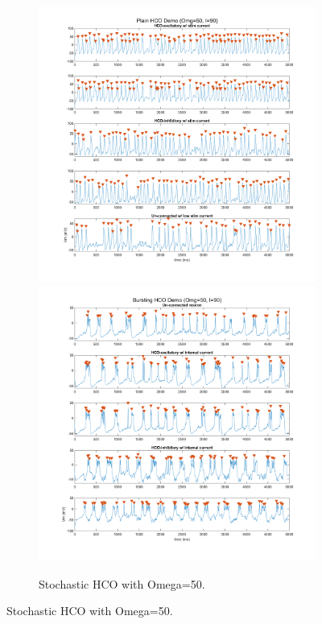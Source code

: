 \documentclass[
]{article}
\begin{document}
\begin{figure} \ContinuedFloat
  \centering
  \begin{subfigure}[b]{\textwidth}  
    \includegraphics[width=.49\textwidth]{figs/old/Fx1_E_HCO_Om5e1_NB.png}
    \includegraphics[width=.49\textwidth]{figs/old/Fx1_E_HCO_Om5e1_B.png}
    \vspace{-0.5cm} \caption{Stochastic HCO with Omega=50.}
  \end{subfigure}
\end{figure}
\end{document}

